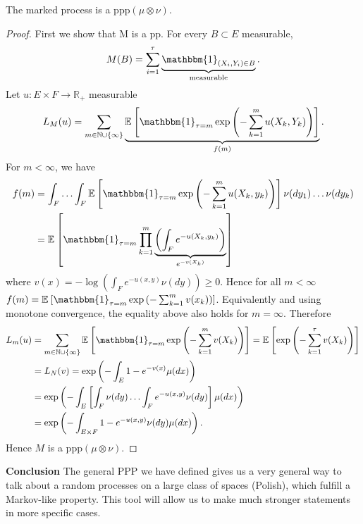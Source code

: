 \begin{theorem}[]
	The marked process is a ppp$(\mu \otimes \nu )$.
\end{theorem}
\begin{proof}
	First we show that M is a pp. For every $B \subset E$ measurable,
	\begin{align}
		M(B) = \sum_{i=1}^{\tau} \underbrace{\mathbbm{1}_{(X_i,Y_i)\in B}}_{\textrm{measurable}}. 
	\end{align}
Let $u:E\times F \to \mathbb{R}_+$ measurable
\begin{align}
	L_M(u) = \sum_{m \in \mathbb{N} \cup \{\infty \}}^{} \underbrace{\mathbb{E}_{} \left[ \mathbbm{1}_{\tau = m} \exp \left(- \sum_{k=1}^{m} u(X_k, Y_k) \right) \right] }_{f(m)}.
\end{align}
For $m<\infty $, we have
\begin{align}
	f(m) &= \int_{F}^{} \ldots \int_{F}^{} \mathbb{E}_{} \left[ \mathbbm{1}_{\tau=m} \exp\left(-\sum_{k=1}^{m} u(X_k, y_k)\right) \right] \nu(dy_1)\ldots \nu(dy_k) \\
	     &= \mathbb{E}_{} \left[ \mathbbm{1}_{\tau = m} \prod_{k=1}^{m}\underbrace{\left( \int_{F}^{} e^{-u(X_k, y_k)}\right)}_{e^{-v(X_k)}} \right] 
\end{align}
where $v(x) = -\log\left(\int_{F}^{} e^{-u(x,y)}\nu(dy) \right) \geq 0$. Hence for all $m < \infty $ $f(m) = \mathbb{E}_{} \left[ \mathbbm{1}_{\tau = m} \exp\left( - \sum_{k=1}^{m} v(x_k)\right) \right] $. Equivalently and using monotone convergence, the equality above also holds for $m=\infty $. Therefore
\begin{align}
	L_m(u) &= \sum_{m \in \mathbb{N}\cup \{\infty \}}^{} \mathbb{E}_{} \left[ \mathbbm{1}_{\tau=m} \exp\left(-\sum_{k=1}^{m} v(X_k) \right) \right] = \mathbb{E}_{} \left[ \exp\left( - \sum_{k=1}^{\tau} v(X_k) \right) \right] \\
	       &= L_{N}(v) = \exp \left( - \int_{E}^{} 1 - e^{-v(x)} \mu (dx) \right) \\
	       &= \exp \left( - \int_{E}^{} \left[ \int_{F}^{} \nu (dy) \ldots \int_{F}^{} e^{-u(x,y)} \nu (dy) \right] \mu (dx) \right) \\
	       &= \exp \left( - \int_{E \times F}^{} 1-e^{-u(x,y)} \nu (dy) \mu (dx) \right).
\end{align}
Hence $M$ is a ppp$(\mu \otimes \nu )$.
\end{proof}


\noindent \textbf{Conclusion} The general PPP we have defined gives us a very general way to talk about a random processes on a large class of spaces (Polish), which fulfill a Markov-like property. This tool will allow us to make much stronger statements in more specific cases.

